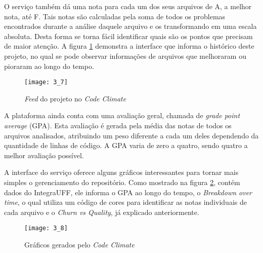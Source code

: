O serviço também dá uma nota para cada um dos seus arquivos de A, a melhor nota, até F. Tais notas são calculadas pela soma de todos os problemas encontrados durante a análise daquele arquivo e os transformando em uma escala absoluta. Desta forma se torna fácil identificar quais são os pontos que precisam de maior atenção. A figura \ref{figura7} demonstra a interface que informa o histórico deste projeto, no qual se pode observar informações de arquivos que melhoraram ou pioraram ao longo do tempo.

\begin{figure}[H]
    \centering
\texttt{[image: 3\_7]}
    \caption{\textit{Feed} do projeto no \textit{Code Climate} }
    \label{figura7}
\end{figure}

A plataforma ainda conta com uma avaliação geral, chamada de \textit{grade point average} (GPA). Esta avaliação é gerada pela média das notas de todos os arquivos analisados, atribuindo um peso diferente a cada um deles dependendo da quantidade de linhas de código. A GPA varia de zero a quatro, sendo quatro a melhor avaliação possível.

A interface do serviço oferece alguns gráficos interessantes para tornar mais simples o gerenciamento do repositório. Como mostrado na figura \ref{figura8}, contém dados do IntegraUFF, ele informa o GPA ao longo do tempo, o \textit{Breakdown over time}, o qual utiliza um código de cores para identificar as notas individuais de cada arquivo e o \textit{Churn vs Quality}, já explicado anteriormente.  

\begin{figure}[H]
    \centering
\texttt{[image: 3\_8]}
    \caption{Gráficos gerados pelo \textit{Code Climate} }
    \label{figura8}
\end{figure}
